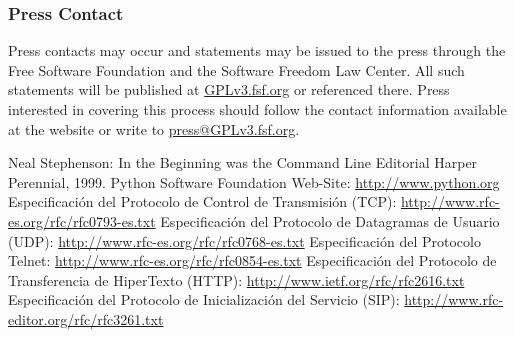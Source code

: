 \documentclass[a4paper,spanish,12pt]{book}
\begin{document}
\subsubsection{Press Contact}\label{PressContact} Press contacts may occur
and statements may be issued to the press through the Free Software
Foundation and the Software Freedom Law Center.  All such statements
will be published at \url{GPLv3.fsf.org} or referenced there.
Press interested in covering this process should follow the contact
information available at the website or write to
\url{press@GPLv3.fsf.org}.

\begin{thebibliography}{99}
 Neal Stephenson: In the Beginning was the Command Line
	Editorial Harper Perennial, 1999.
 Python Software Foundation Web-Site: \url{http://www.python.org}
 Especificación del Protocolo de Control de Transmisión (TCP): \url{http://www.rfc-es.org/rfc/rfc0793-es.txt}
 Especificación del Protocolo de Datagramas de Usuario (UDP): \url{http://www.rfc-es.org/rfc/rfc0768-es.txt}
 Especificación del Protocolo Telnet: \url{http://www.rfc-es.org/rfc/rfc0854-es.txt}
 Especificación del Protocolo de Transferencia de HiperTexto (HTTP): \url{http://www.ietf.org/rfc/rfc2616.txt}
 Especificación del Protocolo de Inicialización del Servicio (SIP): \url{http://www.rfc-editor.org/rfc/rfc3261.txt}
\end{thebibliography}
\end{document}
